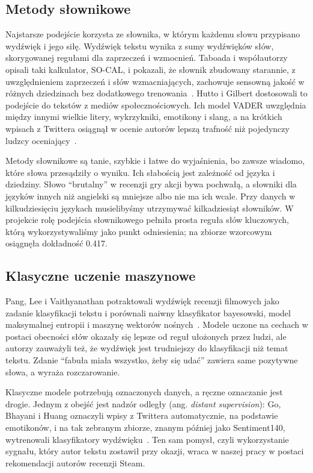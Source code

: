 \subsection{Metody słownikowe}
\label{sec:sentiment-lexicon}

Najstarsze podejście korzysta ze słownika, w którym każdemu słowu przypisano wydźwięk i jego siłę.
Wydźwięk tekstu wynika z sumy wydźwięków słów, skorygowanej regułami dla zaprzeczeń i wzmocnień.
Taboada i współautorzy opisali taki kalkulator, SO-CAL, i pokazali, że słownik zbudowany starannie, z uwzględnieniem zaprzeczeń i słów wzmacniających, zachowuje sensowną jakość w różnych dziedzinach bez dodatkowego trenowania~\cite{taboada2011lexiconbased}.
Hutto i Gilbert dostosowali to podejście do tekstów z mediów społecznościowych.
Ich model VADER uwzględnia między innymi wielkie litery, wykrzykniki, emotikony i slang, a na krótkich wpisach z Twittera osiągnął w ocenie autorów lepszą trafność niż pojedynczy ludzcy oceniający~\cite{hutto2014vader}.

Metody słownikowe są tanie, szybkie i łatwe do wyjaśnienia, bo zawsze wiadomo, które słowa przesądziły o wyniku.
Ich słabością jest zależność od języka i dziedziny.
Słowo \enquote{brutalny} w recenzji gry akcji bywa pochwałą, a słowniki dla języków innych niż angielski są mniejsze albo nie ma ich wcale.
Przy danych w kilkudziesięciu językach musielibyśmy utrzymywać kilkadziesiąt słowników.
W projekcie rolę podejścia słownikowego pełniła prosta reguła słów kluczowych, którą wykorzystywaliśmy jako punkt odniesienia; na zbiorze wzorcowym osiągnęła dokładność \num{0.417}.

\subsection{Klasyczne uczenie maszynowe}
\label{sec:sentiment-classic-ml}

Pang, Lee i Vaithyanathan potraktowali wydźwięk recenzji filmowych jako zadanie klasyfikacji tekstu i porównali naiwny klasyfikator bayesowski, model maksymalnej entropii i maszynę wektorów nośnych~\cite{pang2002thumbs}.
Modele uczone na cechach w postaci obecności słów okazały się lepsze od reguł ułożonych przez ludzi, ale autorzy zauważyli też, że wydźwięk jest trudniejszy do klasyfikacji niż temat tekstu.
Zdanie \enquote{fabuła miała wszystko, żeby się udać} zawiera same pozytywne słowa, a wyraża rozczarowanie.

Klasyczne modele potrzebują oznaczonych danych, a ręczne oznaczanie jest drogie.
Jednym z obejść jest nadzór odległy (ang. \textit{distant supervision}): Go, Bhayani i Huang oznaczyli wpisy z Twittera automatycznie, na podstawie emotikonów, i na tak zebranym zbiorze, znanym później jako Sentiment140, wytrenowali klasyfikatory wydźwięku~\cite{go2009twitter}.
Ten sam pomysł, czyli wykorzystanie sygnału, który autor tekstu zostawił przy okazji, wraca w naszej pracy w postaci rekomendacji autorów recenzji Steam.

